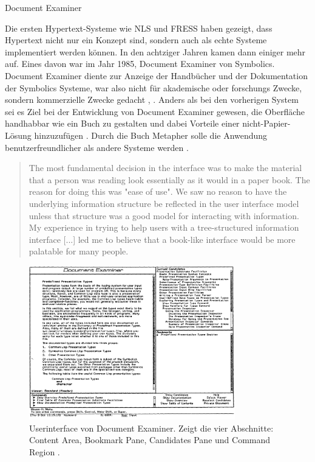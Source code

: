 \begin{section}{Document Examiner}
\label{sec:DocumentExaminer}

Die ersten Hypertext-Systeme wie NLS und FRESS haben gezeigt, dass Hypertext nicht nur ein Konzept sind, sondern auch als echte Systeme implementiert werden können. In den achtziger Jahren kamen dann einiger mehr auf. Eines davon war im Jahr 1985, Document Examiner von Symbolics. Document Examiner diente zur Anzeige der Handbücher und der Dokumentation der Symbolics Systeme, war also nicht für akademische oder forschungs Zwecke, sondern kommerzielle Zwecke gedacht \cite{Walker1987}, \cite[S. 50]{Nielsen1995}. Anders als bei den vorherigen System sei es Ziel bei der Entwicklung von  Document Examiner gewesen, die Oberfläche handhabbar wie ein Buch zu gestalten und dabei Vorteile einer nicht-Papier-Lösung hinzuzufügen \cite{Walker1987}. Durch die Buch Metapher solle die Anwendung benutzerfreundlicher als andere Systeme werden \cite{Walker1987}. 

\begin{quote}
\glqq The most fundamental decision in the interface was to make the material that a person was reading look essentially as it would in a paper book. The reason for doing this was "ease of use". We saw no reason to have the underlying information structure be reflected in the user interface model unless that structure was a good model for interacting with information. My experience in trying to help users with a tree-structured information interface [...] led me to believe that a book-like interface would be more palatable for many people. \grqq{ }\cite{Walker1987}
\end{quote}

\begin{figure}[H]
	\centering
	\includegraphics[width=0.8\textwidth]{image/document}
	\caption{Userinterface von Document Examiner. Zeigt die vier Abschnitte: Content Area, Bookmark Pane, Candidates Pane und Command Region \cite{Walker1987}.}
	\label{fig:ducument}
\end{figure}


\end{section}
